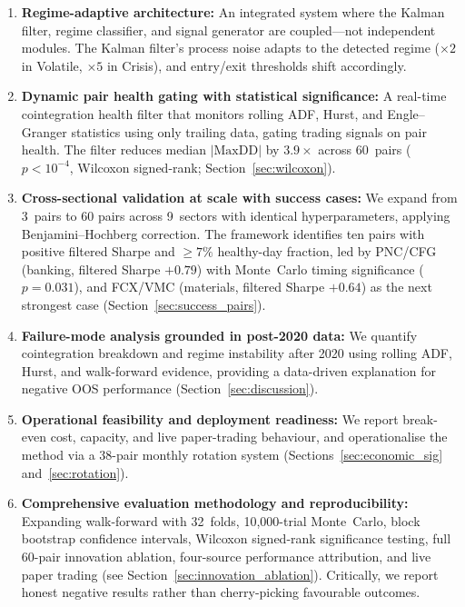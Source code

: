 \documentclass{ieeeaccess}
\begin{document}
\begin{enumerate}
    \item \textbf{Regime-adaptive architecture:}
    An integrated system where the Kalman filter, regime classifier, and signal generator are coupled---not independent modules.
    The Kalman filter's process noise adapts to the detected regime ($\times 2$ in Volatile, $\times 5$ in Crisis), and entry/exit thresholds shift accordingly.

    \item \textbf{Dynamic pair health gating with statistical significance:}
    A real-time cointegration health filter that monitors rolling ADF, Hurst, and Engle--Granger statistics using only trailing data, gating trading signals on pair health.
    The filter reduces median $|\text{MaxDD}|$ by $3.9\times$ across 60~pairs ($p < 10^{-4}$, Wilcoxon signed-rank; Section~\ref{sec:wilcoxon}).

    \item \textbf{Cross-sectional validation at scale with success cases:}
    We expand from 3~pairs to 60 pairs across 9~sectors with identical hyperparameters, applying Benjamini--Hochberg correction.
    The framework identifies ten pairs with positive filtered Sharpe and $\geq 7\%$ healthy-day fraction, led by PNC/CFG (banking, filtered Sharpe $+0.79$) with Monte~Carlo timing significance ($p = 0.031$), and FCX/VMC (materials, filtered Sharpe $+0.64$) as the next strongest case (Section~\ref{sec:success_pairs}).

    \item \textbf{Failure-mode analysis grounded in post-2020 data:}
    We quantify cointegration breakdown and regime instability after 2020 using rolling ADF, Hurst, and walk-forward evidence, providing a data-driven explanation for negative OOS performance (Section~\ref{sec:discussion}).

    \item \textbf{Operational feasibility and deployment readiness:}
    We report break-even cost, capacity, and live paper-trading behaviour, and operationalise the method via a 38-pair monthly rotation system (Sections~\ref{sec:economic_sig} and~\ref{sec:rotation}).

    \item \textbf{Comprehensive evaluation methodology and reproducibility:}
    Expanding walk-forward with 32~folds, 10{,}000-trial Monte~Carlo, block bootstrap confidence intervals, Wilcoxon signed-rank significance testing, full 60-pair innovation ablation, four-source performance attribution, and live paper trading (see Section~\ref{sec:innovation_ablation}).
    Critically, we report honest negative results rather than cherry-picking favourable outcomes.
\end{enumerate}
\end{document}
